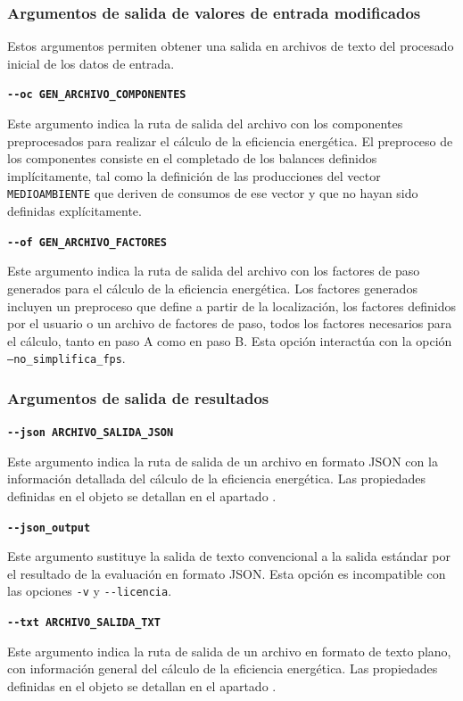 \documentclass[10pt,notitlepage,oneside,a4paper]{article}
\begin{document}
\subsubsection{Argumentos de salida de valores de entrada modificados}

Estos argumentos permiten obtener una salida en archivos de texto del procesado inicial de los datos de entrada.

\textbf{\texttt{-{}-oc GEN\_ARCHIVO\_COMPONENTES}}

Este argumento indica la ruta de salida del archivo con los componentes preprocesados para realizar el cálculo de la eficiencia energética. El preproceso de los componentes consiste en el completado de los balances definidos implícitamente, tal como la definición de las producciones del vector \texttt{MEDIOAMBIENTE} que deriven de consumos de ese vector y que no hayan sido definidas explícitamente.

\textbf{\texttt{-{}-of GEN\_ARCHIVO\_FACTORES}}

Este argumento indica la ruta de salida del archivo con los factores de paso generados para el cálculo de la eficiencia energética. Los factores generados incluyen un preproceso que define a partir de la localización, los factores definidos por el usuario o un archivo de factores de paso, todos los factores necesarios para el cálculo, tanto en paso A como en paso B. Esta opción interactúa con la opción \texttt{--no\_simplifica\_fps}.

\subsubsection{Argumentos de salida de resultados}

\textbf{\texttt{-{}-json ARCHIVO\_SALIDA\_JSON}}

Este argumento indica la ruta de salida de un archivo en formato JSON con la información detallada del cálculo de la eficiencia energética. Las propiedades definidas en el objeto se detallan en el apartado .

\textbf{\texttt{-{}-json\_output}}

Este argumento sustituye la salida de texto convencional a la salida estándar por el resultado de la evaluación en formato JSON. Esta opción es incompatible con las opciones \texttt{-v} y \texttt{-{}-licencia}.

\textbf{\texttt{-{}-txt ARCHIVO\_SALIDA\_TXT}}

Este argumento indica la ruta de salida de un archivo en formato de texto plano, con información general del cálculo de la eficiencia energética. Las propiedades definidas en el objeto se detallan en el apartado .
\end{document}
